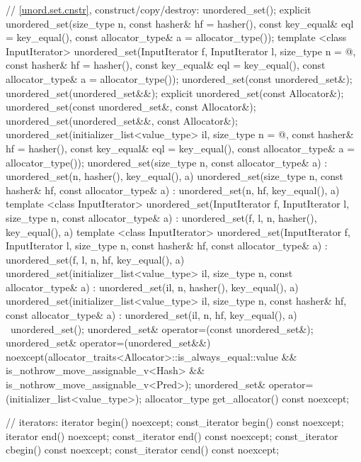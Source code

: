 \begin{codeblock}
{{    // \ref{unord.set.cnstr}, construct/copy/destroy:
    unordered_set();
    explicit unordered_set(size_type n,
                           const hasher& hf = hasher(),
                           const key_equal& eql = key_equal(),
                           const allocator_type& a = allocator_type());
    template <class InputIterator>
      unordered_set(InputIterator f, InputIterator l,
                    size_type n = @\seebelow@,
                    const hasher& hf = hasher(),
                    const key_equal& eql = key_equal(),
                    const allocator_type& a = allocator_type());
    unordered_set(const unordered_set&);
    unordered_set(unordered_set&&);
    explicit unordered_set(const Allocator&);
    unordered_set(const unordered_set&, const Allocator&);
    unordered_set(unordered_set&&, const Allocator&);
    unordered_set(initializer_list<value_type> il,
                  size_type n = @\seebelow@,
                  const hasher& hf = hasher(),
                  const key_equal& eql = key_equal(),
                  const allocator_type& a = allocator_type());
    unordered_set(size_type n, const allocator_type& a)
      : unordered_set(n, hasher(), key_equal(), a) { }
    unordered_set(size_type n, const hasher& hf, const allocator_type& a)
      : unordered_set(n, hf, key_equal(), a) { }
    template <class InputIterator>
      unordered_set(InputIterator f, InputIterator l, size_type n, const allocator_type& a)
        : unordered_set(f, l, n, hasher(), key_equal(), a) { }
    template <class InputIterator>
      unordered_set(InputIterator f, InputIterator l, size_type n, const hasher& hf,
                    const allocator_type& a)
      : unordered_set(f, l, n, hf, key_equal(), a) { }
    unordered_set(initializer_list<value_type> il, size_type n, const allocator_type& a)
      : unordered_set(il, n, hasher(), key_equal(), a) { }
    unordered_set(initializer_list<value_type> il, size_type n, const hasher& hf,
                  const allocator_type& a)
      : unordered_set(il, n, hf, key_equal(), a) { }
    ~unordered_set();
    unordered_set& operator=(const unordered_set&);
    unordered_set& operator=(unordered_set&&)
      noexcept(allocator_traits<Allocator>::is_always_equal::value &&
               is_nothrow_move_assignable_v<Hash> &&
               is_nothrow_move_assignable_v<Pred>);
    unordered_set& operator=(initializer_list<value_type>);
    allocator_type get_allocator() const noexcept;

    // iterators:
    iterator       begin() noexcept;
    const_iterator begin() const noexcept;
    iterator       end() noexcept;
    const_iterator end() const noexcept;
    const_iterator cbegin() const noexcept;
    const_iterator cend() const noexcept;

}}
\end{codeblock}
